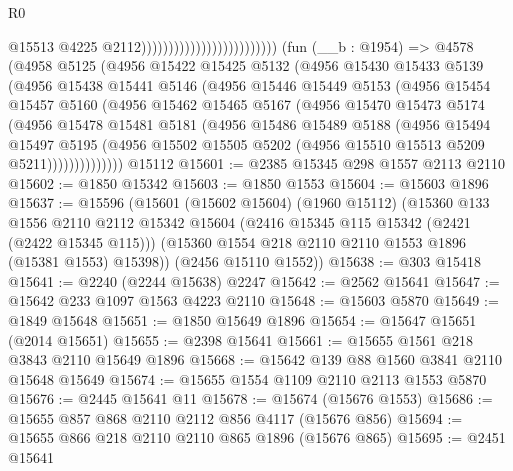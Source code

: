 \begin{lexlean}{R0}
\begin{coremodule}
                                                      @15513
                                                      @4225
                                                      @2112)))))))))))))))))))))))))
    (fun (__b : @1954) =>
    @4578
      (@4958
        @5125
        (@4956
          @15422
          @15425
          @5132
          (@4956
            @15430
            @15433
            @5139
            (@4956
              @15438
              @15441
              @5146
              (@4956
                @15446
                @15449
                @5153
                (@4956
                  @15454
                  @15457
                  @5160
                  (@4956
                    @15462
                    @15465
                    @5167
                    (@4956
                      @15470
                      @15473
                      @5174
                      (@4956
                        @15478
                        @15481
                        @5181
                        (@4956
                          @15486
                          @15489
                          @5188
                          (@4956
                            @15494
                            @15497
                            @5195
                            (@4956
                              @15502
                              @15505
                              @5202
                              (@4956 @15510 @15513 @5209 @5211))))))))))))))
    @15112
@15601 := @2385 @15345 @298 @1557 @2113 @2110
@15602 := @1850 @15342
@15603 := @1850 @1553
@15604 := @15603 @1896
@15637 := @15596
    (@15601
      (@15602 @15604)
      (@1960 @15112)
      (@15360
        @133
        @1556
        @2110
        @2112
        @15342
        @15604
        (@2416 @15345 @115 @15342 (@2421 (@2422 @15345 @115)))
        (@15360 @1554 @218 @2110 @2110 @1553 @1896 (@15381 @1553) @15398))
      (@2456 @15110 @1552))
@15638 := @303 @15418
@15641 := @2240 (@2244 @15638) @2247
@15642 := @2562 @15641
@15647 := @15642 @233 @1097 @1563 @4223 @2110
@15648 := @15603 @5870
@15649 := @1849 @15648
@15651 := @1850 @15649 @1896
@15654 := @15647 @15651 (@2014 @15651)
@15655 := @2398 @15641
@15661 := @15655 @1561 @218 @3843 @2110 @15649 @1896
@15668 := @15642 @139 @88 @1560 @3841 @2110 @15648 @15649
@15674 := @15655 @1554 @1109 @2110 @2113 @1553 @5870
@15676 := @2445 @15641 @11
@15678 := @15674 (@15676 @1553)
@15686 := @15655 @857 @868 @2110 @2112 @856 @4117 (@15676 @856)
@15694 := @15655 @866 @218 @2110 @2110 @865 @1896 (@15676 @865)
@15695 := @2451 @15641

\end{coremodule}
\end{lexlean}
